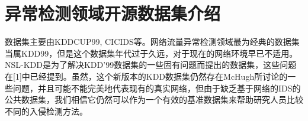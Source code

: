 













\section{异常检测领域开源数据集介绍}
数据集主要由KDDCUP99, CICIDS等。网络流量异常检测领域最为经典的数据集当属KDD99，但是这个数据集年代过于久远，对于现在的网络环境早已不适用。 NSL-KDD是为了解决KDD'99数据集的一些固有问题而提出的数据集，这些问题在[1]中已经提到。虽然，这个新版本的KDD数据集仍然存在McHugh所讨论的一些问题，并且可能不能完美地代表现有的真实网络，但由于缺乏基于网络的IDS的公共数据集，我们相信它仍然可以作为一个有效的基准数据集来帮助研究人员比较不同的入侵检测方法。

